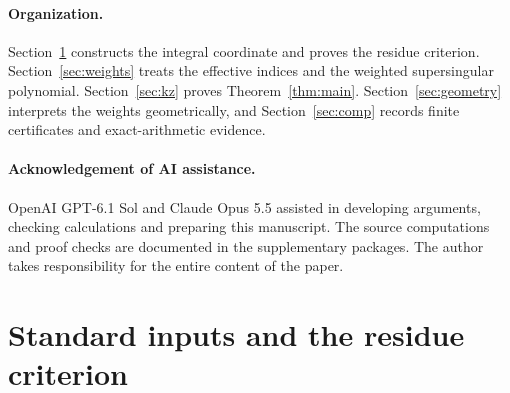 \documentclass[11pt,a4paper]{article}
\numberwithin{equation}{section}
\theoremstyle{definition}
\theoremstyle{remark}
\begin{document}
\paragraph{Organization.}
Section~\ref{sec:imports} constructs the integral coordinate and proves
the residue criterion. Section~\ref{sec:weights} treats the effective
indices and the weighted supersingular polynomial. Section~\ref{sec:kz}
proves Theorem~\ref{thm:main}. Section~\ref{sec:geometry} interprets the
weights geometrically, and Section~\ref{sec:comp} records finite
certificates and exact-arithmetic evidence.

\paragraph{Acknowledgement of AI assistance.}
OpenAI GPT-6.1 Sol and Claude Opus 5.5 assisted in developing arguments, checking
calculations and preparing this manuscript. The source computations
and proof checks are documented in the supplementary packages.
The author takes responsibility for the entire content of the paper.

\section{Standard inputs and the residue criterion}\label{sec:imports}
\end{document}
